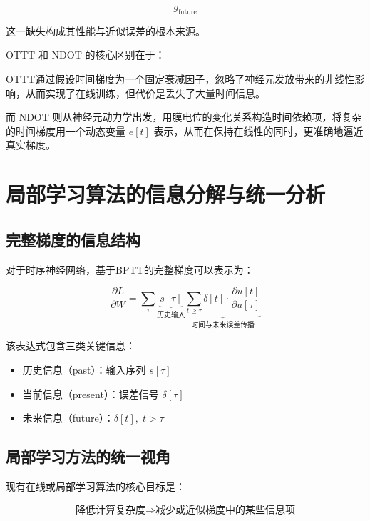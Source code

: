 \documentclass[journal,12pt,onecolumn]{IEEEtran}
\begin{document}
\begin{equation}
g_{\text{future}}
\end{equation}

这一缺失构成其性能与近似误差的根本来源。


OTTT 和 NDOT 的核心区别在于：

OTTT通过假设时间梯度为一个固定衰减因子，忽略了神经元发放带来的非线性影响，从而实现了在线训练，但代价是丢失了大量时间信息。

而 NDOT 则从神经元动力学出发，用膜电位的变化关系构造时间依赖项，将复杂的时间梯度用一个动态变量 $e[t]$ 表示，从而在保持在线性的同时，更准确地逼近真实梯度。


\section{局部学习算法的信息分解与统一分析}

\subsection{完整梯度的信息结构}

对于时序神经网络，基于BPTT的完整梯度可以表示为：

\begin{equation}
\frac{\partial L}{\partial W}
=
\sum_{\tau}
\underbrace{s[\tau]}_{\text{历史输入}}
\underbrace{\sum_{t \ge \tau} \delta[t] \cdot \frac{\partial u[t]}{\partial u[\tau]}}_{\text{时间与未来误差传播}}
\end{equation}

该表达式包含三类关键信息：

\begin{itemize}
\item 历史信息（past）：输入序列 $s[\tau]$
\item 当前信息（present）：误差信号 $\delta[\tau]$
\item 未来信息（future）：$\delta[t], \; t>\tau$
\end{itemize}





\subsection{局部学习方法的统一视角}

现有在线或局部学习算法的核心目标是：

\begin{equation}
\text{降低计算复杂度} \Rightarrow \text{减少或近似梯度中的某些信息项}
\end{equation}
\end{document}
